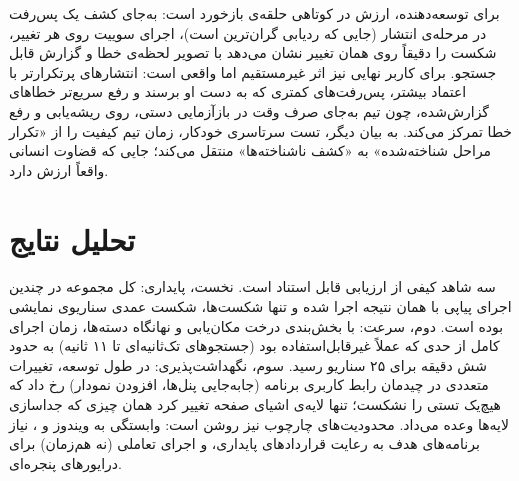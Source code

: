 برای توسعه‌دهنده، ارزش در کوتاهی حلقه‌ی بازخورد است: به‌جای کشف یک پس‌رفت در مرحله‌ی انتشار (جایی که ردیابی گران‌ترین است)، اجرای سوییت روی هر تغییر، شکست را دقیقاً روی همان تغییر نشان می‌دهد با تصویر لحظه‌ی خطا و گزارش قابل جستجو. برای کاربر نهایی نیز اثر غیرمستقیم اما واقعی است: انتشارهای پرتکرارتر با اعتماد بیشتر، پس‌رفت‌های کمتری که به دست او برسند و رفع سریع‌تر خطاهای گزارش‌شده، چون تیم به‌جای صرف وقت در بازآزمایی دستی، روی ریشه‌یابی و رفع خطا تمرکز می‌کند. به بیان دیگر، تست سرتاسری خودکار، زمان تیم کیفیت را از «تکرار مراحل شناخته‌شده» به «کشف ناشناخته‌ها» منتقل می‌کند؛ جایی که قضاوت انسانی واقعاً ارزش دارد.

\section{تحلیل نتایج}
سه شاهد کیفی از ارزیابی قابل استناد است. نخست، پایداری: کل مجموعه در چندین اجرای پیاپی با همان نتیجه اجرا شده و تنها شکست‌ها، شکست عمدی سناریوی نمایشی بوده است. دوم، سرعت: با بخش‌بندی درخت مکان‌یابی و نهانگاه دسته‌ها، زمان اجرای کامل از حدی که عملاً غیرقابل‌استفاده بود (جستجوهای تک‌ثانیه‌ای تا ۱۱ ثانیه) به حدود شش دقیقه برای ۲۵ سناریو رسید. سوم، نگهداشت‌پذیری: در طول توسعه، تغییرات متعددی در چیدمان رابط کاربری برنامه (جابه‌جایی پنل‌ها، افزودن نمودار) رخ داد که هیچ‌یک تستی را نشکست؛ تنها لایه‌ی اشیای صفحه تغییر کرد \pdash{} همان چیزی که جداسازی لایه‌ها وعده می‌داد. محدودیت‌های چارچوب نیز روشن است: وابستگی به ویندوز و
،
نیاز برنامه‌های هدف به رعایت قراردادهای پایداری، و اجرای تعاملی (نه هم‌زمان) برای درایورهای پنجره‌ای.